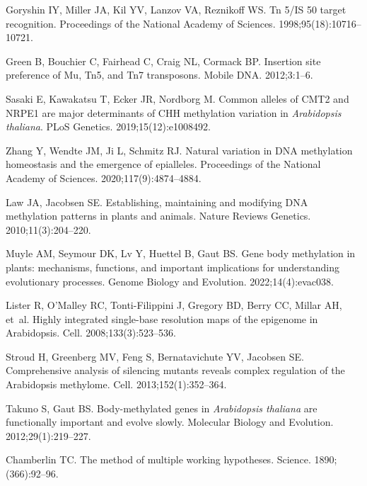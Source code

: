 \documentclass[10pt,draft,letterpaper]{article}
\begin{document}
\begin{thebibliography}{10}
Goryshin IY, Miller JA, Kil YV, Lanzov VA, Reznikoff WS.
\newblock Tn 5/IS 50 target recognition.
\newblock Proceedings of the National Academy of Sciences. 1998;95(18):10716--10721.

Green B, Bouchier C, Fairhead C, Craig NL, Cormack BP.
\newblock Insertion site preference of Mu, Tn5, and Tn7 transposons.
\newblock Mobile DNA. 2012;3:1--6.

Sasaki E, Kawakatsu T, Ecker JR, Nordborg M.
\newblock Common alleles of CMT2 and NRPE1 are major determinants of CHH methylation variation in \emph{Arabidopsis thaliana}.
\newblock PLoS Genetics. 2019;15(12):e1008492.

Zhang Y, Wendte JM, Ji L, Schmitz RJ.
\newblock Natural variation in DNA methylation homeostasis and the emergence of epialleles.
\newblock Proceedings of the National Academy of Sciences. 2020;117(9):4874--4884.

Law JA, Jacobsen SE.
\newblock Establishing, maintaining and modifying DNA methylation patterns in plants and animals.
\newblock Nature Reviews Genetics. 2010;11(3):204--220.

Muyle AM, Seymour DK, Lv Y, Huettel B, Gaut BS.
\newblock Gene body methylation in plants: mechanisms, functions, and important implications for understanding evolutionary processes.
\newblock Genome Biology and Evolution. 2022;14(4):evac038.

Lister R, O'Malley RC, Tonti-Filippini J, Gregory BD, Berry CC, Millar AH, et~al.
\newblock Highly integrated single-base resolution maps of the epigenome in Arabidopsis.
\newblock Cell. 2008;133(3):523--536.

Stroud H, Greenberg MV, Feng S, Bernatavichute YV, Jacobsen SE.
\newblock Comprehensive analysis of silencing mutants reveals complex regulation of the Arabidopsis methylome.
\newblock Cell. 2013;152(1):352--364.

Takuno S, Gaut BS.
\newblock Body-methylated genes in \emph{Arabidopsis thaliana} are functionally important and evolve slowly.
\newblock Molecular Biology and Evolution. 2012;29(1):219--227.

Chamberlin TC.
\newblock The method of multiple working hypotheses.
\newblock Science. 1890;(366):92--96.


\end{thebibliography}
\end{document}
